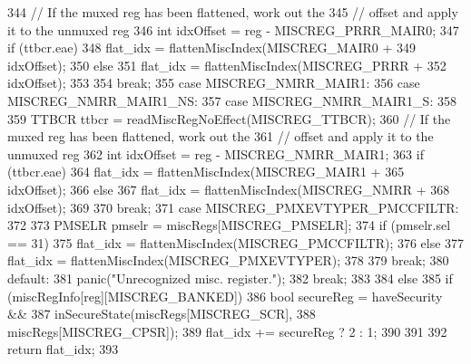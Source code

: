 \begin{DoxyCode}
{{{{344                         // If the muxed reg has been flattened, work out the
345                         // offset and apply it to the unmuxed reg
346                         int idxOffset = reg - MISCREG_PRRR_MAIR0;
347                         if (ttbcr.eae)
348                             flat_idx = flattenMiscIndex(MISCREG_MAIR0 +
349                                                         idxOffset);
350                         else
351                             flat_idx = flattenMiscIndex(MISCREG_PRRR +
352                                                         idxOffset);
353                     }
354                     break;
355                   case MISCREG_NMRR_MAIR1:
356                   case MISCREG_NMRR_MAIR1_NS:
357                   case MISCREG_NMRR_MAIR1_S:
358                     {
359                         TTBCR ttbcr = readMiscRegNoEffect(MISCREG_TTBCR);
360                         // If the muxed reg has been flattened, work out the
361                         // offset and apply it to the unmuxed reg
362                         int idxOffset = reg - MISCREG_NMRR_MAIR1;
363                         if (ttbcr.eae)
364                             flat_idx = flattenMiscIndex(MISCREG_MAIR1 +
365                                                         idxOffset);
366                         else
367                             flat_idx = flattenMiscIndex(MISCREG_NMRR +
368                                                         idxOffset);
369                     }
370                     break;
371                   case MISCREG_PMXEVTYPER_PMCCFILTR:
372                     {
373                         PMSELR pmselr = miscRegs[MISCREG_PMSELR];
374                         if (pmselr.sel == 31)
375                             flat_idx = flattenMiscIndex(MISCREG_PMCCFILTR);
376                         else
377                             flat_idx = flattenMiscIndex(MISCREG_PMXEVTYPER);
378                     }
379                     break;
380                   default:
381                     panic("Unrecognized misc. register.\n");
382                     break;
383                 }
384             } else {
385                 if (miscRegInfo[reg][MISCREG_BANKED]) {
386                     bool secureReg = haveSecurity &&
387                                      inSecureState(miscRegs[MISCREG_SCR],
388                                                    miscRegs[MISCREG_CPSR]);
389                     flat_idx += secureReg ? 2 : 1;
390                 }
391             }
392             return flat_idx;
393         }
\end{DoxyCode}
